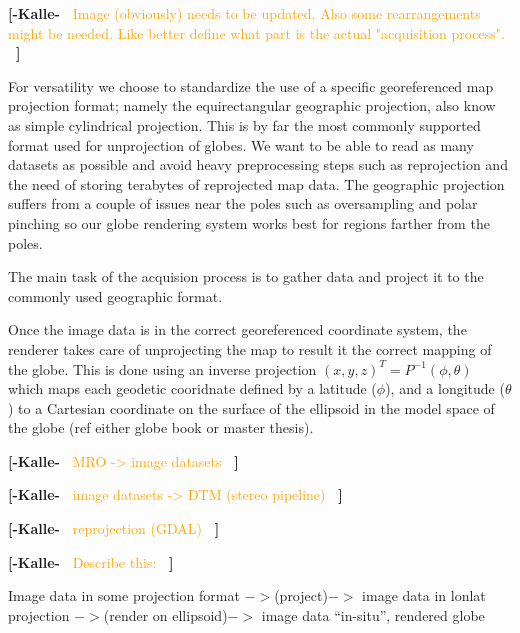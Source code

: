 \documentclass[journal]{vgtc}                %
\newcommand{\kallecomment}[1]{\textbf{[-Kalle-~}
    \textcolor{orange}{#1}
    \textbf{~]}}
\begin{document}
\kallecomment{Image (obviously) needs to be updated. Also some rearrangements might be needed. Like better define what part is the actual "acquisition process".}

For versatility we choose to standardize the use of a specific georeferenced map projection format; namely the equirectangular geographic projection, also know as simple cylindrical projection.
This is by far the most commonly supported format used for unprojection of globes.
We want to be able to read as many datasets as possible and avoid heavy preprocessing steps such as reprojection and the need of storing terabytes of reprojected map data.
The geographic projection suffers from a couple of issues near the poles such as oversampling and polar pinching so our globe rendering system works best for regions farther from the poles.

The main task of the acquision process is to gather data and project it to the commonly used geographic format.

Once the image data is in the correct georeferenced coordinate system, the renderer takes care of unprojecting the map to result it the correct mapping of the globe.
This is done using an inverse projection $(x,y,z)^T = P^{-1}(\phi, \theta)$ which maps each geodetic cooridnate defined by a latitude ($\phi$), and a longitude ($\theta$) to a Cartesian coordinate on the surface of the ellipsoid in the model space of the globe (ref either globe book or master thesis).

\kallecomment{MRO -> image datasets}

\kallecomment{image datasets -> DTM (stereo pipeline)}

\kallecomment{reprojection (GDAL)}

\kallecomment{Describe this:}

Image data in some projection format $->$(project)$->$ image data in lonlat projection $->$(render on ellipsoid)$->$ image data ``in-situ'', rendered globe
\end{document}

